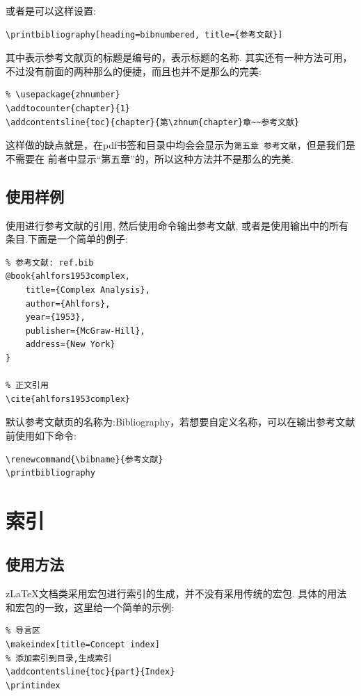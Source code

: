 或者是可以这样设置:
\begin{verbatim}
\printbibliography[heading=bibnumbered, title={参考文献}]
\end{verbatim}

其中表示参考文献页的标题是编号的，表示标题的名称.
其实还有一种方法可用，不过没有前面的两种那么的便捷，而且也并不是那么的完美:
\begin{verbatim}
% \usepackage{zhnumber}
\addtocounter{chapter}{1}
\addcontentsline{toc}{chapter}{第\zhnum{chapter}章~~参考文献}
\end{verbatim}

这样做的缺点就是，在pdf书签和目录中均会会显示为\texttt{第五章  参考文献}，但是我们是不需要在
前者中显示``第五章''的，所以这种方法并不是那么的完美.

\subsection{使用样例}
使用进行参考文献的引用, 然后使用命令\cmd{\printbibliography}输出参考文献,
或者是使用\cmd{\nocite{*}}输出中的所有条目.下面是一个简单的例子:

\begin{verbatim}
% 参考文献: ref.bib
@book{ahlfors1953complex,
    title={Complex Analysis},
    author={Ahlfors},
    year={1953},
    publisher={McGraw-Hill},
    address={New York}
}

% 正文引用
\cite{ahlfors1953complex}
\end{verbatim}

默认参考文献页的名称为:Bibliography，若想要自定义名称，可以在输出参考文献前使用如下命令:
\begin{verbatim}
\renewcommand{\bibname}{参考文献}
\printbibliography
\end{verbatim}


\section{索引}
\subsection{使用方法}
z\LaTeX{}文档类采用宏包进行索引的生成，并不没有采用传统的宏包.
具体的用法和宏包的一致，这里给一个简单的示例:

\begin{verbatim}
% 导言区
\makeindex[title=Concept index]
% 添加索引到目录,生成索引
\addcontentsline{toc}{part}{Index}
\printindex
\end{verbatim}


